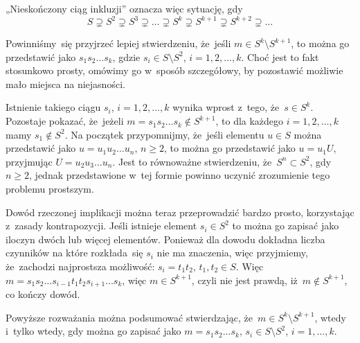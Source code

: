 \documentclass[a4paper,11pt]{article}
\begin{document}
„Nieskończony ciąg inkluzji” oznacza więc sytuację, gdy
\begin{equation}
  \label{eq:Forys-Forys-43}
  S \supsetneq S^{ 2 } \supsetneq S^{ 3 } \supsetneq \ldots \supsetneq S^{ k } \supsetneq S^{ k + 1 } \supsetneq S^{ k + 2 } \supsetneq \ldots
\end{equation}

\vspace{\spaceFour}





\start {} Powinniśmy~się przyjrzeć lepiej stwierdzeniu, że~jeśli
$m \in S^{ k } \setminus S^{ k + 1 }$, to można go przedstawić jako
$s_{ 1 } s_{ 2 } \ldots s_{ k }$, gdzie $s_{ i } \in S \setminus S^{ 2 }$, $i = 1, 2, \ldots, k$.
Choć jest to fakt stosunkowo prosty, omówimy go w~sposób szczegółowy, by
pozostawić możliwie mało miejsca na niejasności.

Istnienie takiego ciągu $s_{ i }$, $i = 1, 2, \ldots, k$ wynika wprost z~tego,
że~$s \in S^{ k }$. Pozostaje pokazać, że~jeżeli
$m = s_{ 1 } s_{ 2 } \ldots s_{ k } \notin S^{ k + 1 }$, to dla każdego $i = 1, 2, \ldots, k$
mamy $s_{ 1 } \notin S^{ 2 }$. Na początek przypomnijmy, że~jeśli elementu
$u \in S$ można przedstawić jako $u = u_{ 1 } u_{ 2 } \ldots u_{ n }$, $n \geq 2$, to
można go przedstawić jako $u = u_{ 1 } U$, przyjmując
$U = u_{ 2 } u_{ 3 } \ldots u_{ n }$. Jest to równoważne stwierdzeniu,
że~$S^{ n } \subset S^{ 2 }$, gdy $n \geq 2$, jednak przedstawione
w~tej formie powinno uczynić zrozumienie tego problemu prostszym.

Dowód rzeczonej implikacji można teraz przeprowadzić bardzo prosto,
korzystając z~zasady kontrapozycji. Jeśli istnieje element
$s_{ i } \in S^{ 2 }$ to można go zapisać jako iloczyn dwóch lub więcej
elementów. Ponieważ dla dowodu dokładna liczba czynników na które
rozkłada~się $s_{ i }$ nie ma znaczenia, więc przyjmiemy, że~zachodzi
najprostsza możliwość: $s_{ i } = t_{ 1 } t_{ 2 }$, $t_{ 1 }, t_{ 2 } \in S$.
Więc $m = s_{ 1 } s_{ 2 } \ldots s_{ i - 1 } t_{ 1 } t_{ 2 }
s_{ i + 1 } \ldots s_{ k }$, więc $m \in S^{ k + 1 }$, czyli nie jest prawdą,
iż~$m \notin S^{ k + 1 }$, co kończy dowód.

Powyższe rozważania można podsumować stwierdzając,
że~$m \in S^{ k } \setminus S^{ k + 1 }$, wtedy i~tylko wtedy, gdy można go zapisać jako
$m = s_{ 1 } s_{ 2 } \ldots s_{ k }$, $s_{ i } \in S \setminus S^{ 2 }$, $i = 1, \ldots, k$.

\vspace{\spaceFour}
\end{document}
